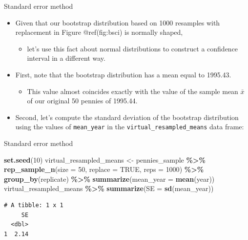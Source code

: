 \documentclass[
  ignorenonframetext,
]{beamer}
\newenvironment{Shaded}{\begin{snugshade}}{\end{snugshade}}
\newcommand{\AttributeTok}[1]{\textcolor[rgb]{0.13,0.29,0.53}{#1}}
\newcommand{\ConstantTok}[1]{\textcolor[rgb]{0.56,0.35,0.01}{#1}}
\newcommand{\DecValTok}[1]{\textcolor[rgb]{0.00,0.00,0.81}{#1}}
\newcommand{\FunctionTok}[1]{\textcolor[rgb]{0.13,0.29,0.53}{\textbf{#1}}}
\newcommand{\NormalTok}[1]{#1}
\newcommand{\OtherTok}[1]{\textcolor[rgb]{0.56,0.35,0.01}{#1}}
\newcommand{\SpecialCharTok}[1]{\textcolor[rgb]{0.81,0.36,0.00}{\textbf{#1}}}
\providecommand{\tightlist}{%
  \setlength{\itemsep}{0pt}\setlength{\parskip}{0pt}}
\begin{document}
\begin{frame}[fragile]{Standard error method}
\protect\hypertarget{standard-error-method}{}
\begin{itemize}
\item
  Given that our bootstrap distribution based on 1000 resamples with
  replacement in Figure @ref(fig:bsci) is normally shaped,

  \begin{itemize}
  \tightlist
  \item
    let's use this fact about normal distributions to construct a
    confidence interval in a different way.
  \end{itemize}
\item
  First, note that the bootstrap distribution has a mean equal to
  1995.43.

  \begin{itemize}
  \tightlist
  \item
    This value almost coincides exactly with the value of the sample
    mean \(\bar{x}\) of our original 50 pennies of 1995.44.
  \end{itemize}
\item
  Second, let's compute the standard deviation of the bootstrap
  distribution using the values of \texttt{mean\_year} in the
  \texttt{virtual\_resampled\_means} data frame:
\end{itemize}
\end{frame}

\begin{frame}[fragile]{Standard error method}
\protect\hypertarget{standard-error-method-1}{}
\begin{Shaded}
\begin{Highlighting}[]
\FunctionTok{set.seed}\NormalTok{(}\DecValTok{10}\NormalTok{)}
\NormalTok{virtual\_resampled\_means }\OtherTok{\textless{}{-}}\NormalTok{ pennies\_sample }\SpecialCharTok{\%\textgreater{}\%} 
  \FunctionTok{rep\_sample\_n}\NormalTok{(}\AttributeTok{size =} \DecValTok{50}\NormalTok{, }\AttributeTok{replace =} \ConstantTok{TRUE}\NormalTok{, }\AttributeTok{reps =} \DecValTok{1000}\NormalTok{) }\SpecialCharTok{\%\textgreater{}\%} 
  \FunctionTok{group\_by}\NormalTok{(replicate) }\SpecialCharTok{\%\textgreater{}\%} 
  \FunctionTok{summarize}\NormalTok{(}\AttributeTok{mean\_year =} \FunctionTok{mean}\NormalTok{(year))}
\NormalTok{virtual\_resampled\_means }\SpecialCharTok{\%\textgreater{}\%} \FunctionTok{summarize}\NormalTok{(}\AttributeTok{SE =} \FunctionTok{sd}\NormalTok{(mean\_year))}
\end{Highlighting}
\end{Shaded}

\begin{verbatim}
# A tibble: 1 x 1
     SE
  <dbl>
1  2.14
\end{verbatim}
\end{frame}
\end{document}

